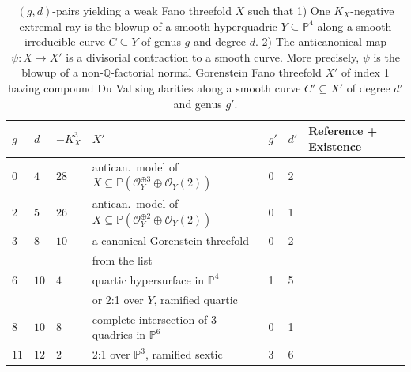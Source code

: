 \documentclass[english,11pt,reqno]{amsart}
\newcommand{\sub}{\subseteq}
\newcommand{\Pthree}{\mathbb{P}^3}
\newcommand{\Pfour}{\mathbb{P}^4}
\begin{document}
%
\vspace{-0.5cm}
\begin{table}[H]
\caption{$(g,d)$-pairs yielding a weak Fano threefold $X$ such that 1) One $K_X$-negative extremal ray is the blowup of a smooth hyperquadric $Y\sub \Pfour$ along a smooth irreducible curve $C\sub Y$ of genus $g$ and degree $d$. 2) The anticanonical map $\psi:X\rightarrow X'$ is a divisorial contraction to a smooth curve. More precisely, $\psi$ is the blowup of a non-$\mathbb{Q}$-factorial normal Gorenstein Fano threefold $X'$ of index 1 having compound Du Val singularities along a smooth curve $C'\sub X'$ of degree $d'$ and genus $g'$.
}
\label{table:anticanonical_map_divisorial}
\begin{minipage}[h]{\textwidth}
\vspace{5pt}
\centering
\begin{tabular}{|l|l|l|l|l|l|l|}
\hline
$g$ & $d$ & $-K_X^3$ & $X'$ & $g'$ & $d'$ & Reference + Existence \\
\hline
$0$ & $4$ & $28$ & antican.\ model of $X \sub \mathbb{P}(\mathcal{O}_Y^{\oplus 3} \oplus \mathcal{O}_Y(2))$ & 0 &2 & \cite[A.4 Nr.\ 18]{Weak_Fano_threefolds_I-Jahnke_Peternell_Radloff}\\
\hline
$2$ & $5$ & $26$ & antican.\ model of $X \sub \mathbb{P}(\mathcal{O}_Y^{\oplus 2} \oplus \mathcal{O}_Y(2))$ & 0 & 
1 & \cite[A.4 Nr.\ 17]{Weak_Fano_threefolds_I-Jahnke_Peternell_Radloff}\\
\hline
$3$ & $8$ & $10$ & a canonical Gorenstein threefold & 0 & 2 & \cite[A.4 Nr.\ 16]{Weak_Fano_threefolds_I-Jahnke_Peternell_Radloff}\\
& & & from the list \cite[A.1]{Weak_Fano_threefolds_I-Jahnke_Peternell_Radloff} & & & \\ \hline
$6$ & $10$ & $4$ & quartic hypersurface in $\Pfour$ & 1 & 5& \cite[A4 Nr.\ 14]{Weak_Fano_threefolds_I-Jahnke_Peternell_Radloff}\\
& & & or 2:1 over $Y$, ramified quartic & & & \\
\hline
$8$ & $10$ & $8$ & complete intersection of 3 quadrics in $\mathbb{P}^6$ & 0 & 1 & \cite[A.4 Nr.\ 15]{Weak_Fano_threefolds_I-Jahnke_Peternell_Radloff}\\
\hline
$11$ & $12$ & $2$ & 2:1 over $\Pthree$, ramified sextic & 3 & 6 & \cite[A.4 Nr.\ 13]{Weak_Fano_threefolds_I-Jahnke_Peternell_Radloff}\\			
\hline
\end{tabular}		
\end{minipage}
\end{table}	
\end{document}
